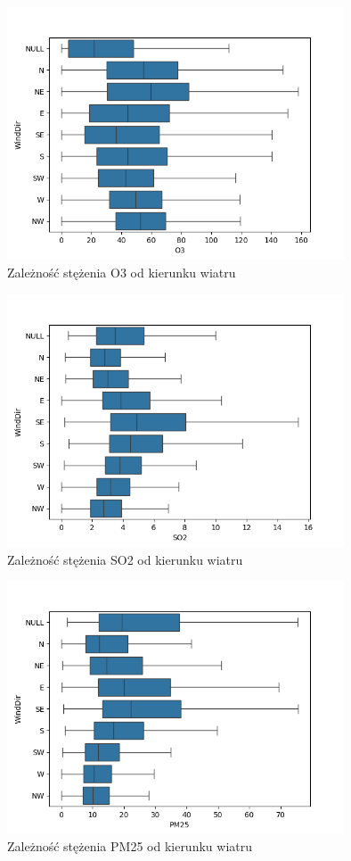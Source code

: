 \documentclass[18pt, letterpaper]{article}
\begin{document}
\begin{figure}[H]
\centering
\includegraphics[width=100mm, height=75mm]{visualisations/wind_dir_pollution_patterns/wind_dir_O3.png}
\caption{Zależność stężenia O3 od kierunku wiatru}
\end{figure}

\begin{figure}[H]
\centering
\includegraphics[width=100mm, height=75mm]{visualisations/wind_dir_pollution_patterns/wind_dir_SO2.png}
\caption{Zależność stężenia SO2 od kierunku wiatru}
\end{figure}

\begin{figure}[H]
\centering
\includegraphics[width=100mm, height=75mm]{visualisations/wind_dir_pollution_patterns/wind_dir_PM25.png}
\caption{Zależność stężenia PM25 od kierunku wiatru}
\end{figure}
\end{document}
